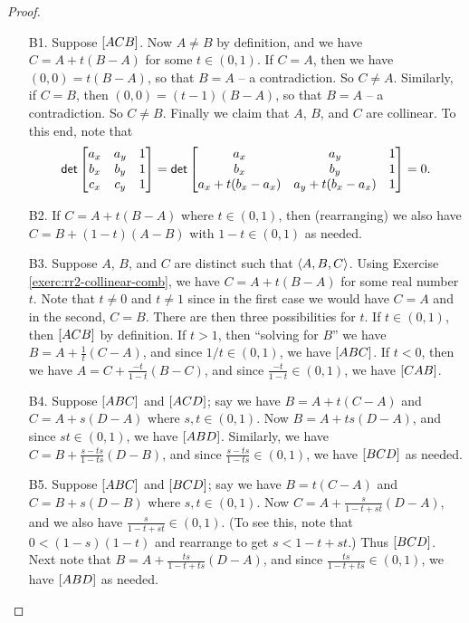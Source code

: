 \begin{proof}\mbox{}
\begin{itemize}
\item[B1.] Suppose \([ A C B ]\).
Now \(A \neq B\) by definition, and we have \(C = A + t(B-A)\) for some \(t \in (0,1)\).
If \(C = A\), then we have \((0,0) = t(B-A)\), so that \(B = A\) -- a contradiction.
So \(C \neq A\).
Similarly, if \(C = B\), then \((0,0) = (t-1)(B-A)\), so that \(B = A\) -- a contradiction.
So \(C \neq B\).
Finally we claim that \(A\), \(B\), and \(C\) are collinear.
To this end, note that \[ \mathsf{det} \begin{bmatrix} a_x & a_y & 1 \\ b_x & b_y & 1 \\ c_x & c_y & 1 \end{bmatrix} = \mathsf{det} \begin{bmatrix} a_x & a_y & 1 \\ b_x & b_y & 1 \\ a_x + t(b_x-a_x) & a_y + t(b_x-a_x) & 1 \end{bmatrix} = 0. \]

\item[B2.] If \(C = A + t(B-A)\) where \(t \in (0,1)\), then (rearranging) we also have \(C = B + (1-t)(A-B)\) with \(1-t \in (0,1)\) as needed.

\item[B3.] Suppose \(A\), \(B\), and \(C\) are distinct such that \(\langle A, B, C \rangle\).
Using Exercise \ref{exerc:rr2-collinear-comb}, we have \(C = A + t(B-A)\) for some real number \(t\).
Note that \(t \neq 0\) and \(t \neq 1\) since in the first case we would have \(C = A\) and in the second, \(C = B\).
There are then three possibilities for \(t\).
If \(t \in (0,1)\), then \([ A C B ]\) by definition.
If \(t > 1\), then ``solving for \(B\)'' we have \(B = A + \frac{1}{t}(C-A)\), and since \(1/t \in (0,1)\), we have \([ A B C ]\).
If \(t < 0\), then we have \(A = C + \frac{-t}{1-t}(B-C)\), and since \(\frac{-t}{1-t} \in (0,1)\), we have \([ C A B ]\).

\item[B4.] Suppose \([ A B C ]\) and \([ A C D ]\); say we have \(B = A + t(C-A)\) and \(C = A + s(D-A)\) where \(s,t \in (0,1)\).
Now \(B = A + ts(D-A)\), and since \(st \in (0,1)\), we have \([ A B D ]\).
Similarly, we have \(C = B + \frac{s-ts}{1-ts}(D-B)\), and since \(\frac{s-ts}{1-ts} \in (0,1)\), we have \([ B C D ]\) as needed.

\item[B5.] Suppose \([ A B C ]\) and \([ B C D ]\); say we have \(B = t(C-A)\) and \(C = B + s(D-B)\) where \(s,t \in (0,1)\).
Now \(C = A + \frac{s}{1-t+st}(D-A)\), and we also have \(\frac{s}{1-t+st} \in (0,1)\).
(To see this, note that \(0 < (1-s)(1-t)\) and rearrange to get \(s < 1-t+st\).)
Thus \([ B C D ]\).
Next note that \(B = A + \frac{ts}{1-t+ts}(D-A)\), and since \(\frac{ts}{1-t+ts} \in (0,1)\), we have \([ A B D ]\) as needed.


\end{itemize}
\end{proof}
